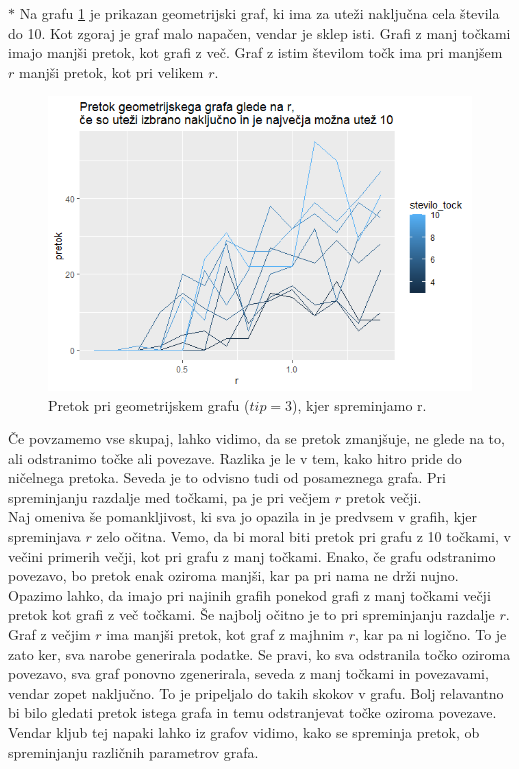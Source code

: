 \documentclass[a4paper]{article}
\begin{document}
\newpage
$\ast$  Na grafu \ref{fig16} je prikazan geometrijski graf, ki ima za uteži naključna cela števila do 10. Kot zgoraj je graf malo napačen, vendar je sklep isti. Grafi z manj točkami imajo manjši pretok, kot grafi z več. Graf z istim številom točk ima pri manjšem $r$ manjši pretok, kot pri velikem $r$. 
\begin{figure}[H]
\centerline{\includegraphics[scale=.6]{p12.PNG}}
\caption{Pretok pri geometrijskem grafu ($tip = 3$),  kjer spreminjamo r.}
\label{fig16}
\end{figure} 

Če povzamemo vse skupaj, lahko vidimo, da se pretok zmanjšuje, ne glede na to, ali odstranimo točke ali povezave. Razlika je le v tem, kako hitro pride do ničelnega pretoka. Seveda je to odvisno tudi od posameznega grafa. Pri spreminjanju razdalje med točkami, pa je pri večjem $r$ pretok večji. \\


Naj omeniva še pomankljivost, ki sva jo opazila in je predvsem v grafih, kjer spreminjava $r$ zelo očitna. Vemo, da bi moral biti pretok pri grafu z 10 točkami, v večini primerih večji, kot pri grafu z manj točkami. Enako, če grafu odstranimo povezavo, bo pretok enak oziroma manjši, kar pa pri nama ne drži nujno. Opazimo lahko, da imajo pri najinih grafih ponekod grafi z manj točkami večji pretok kot grafi z več točkami. Še najbolj očitno je to pri spreminjanju razdalje $r$. Graf z večjim $r$ ima manjši pretok, kot graf z majhnim $r$, kar pa ni logično. To je zato ker, sva narobe generirala podatke. Se pravi, ko sva odstranila točko oziroma povezavo, sva graf ponovno zgenerirala, seveda z manj točkami in povezavami, vendar zopet naključno. To je pripeljalo do takih skokov v grafu. Bolj relavantno bi bilo gledati pretok istega grafa in temu odstranjevat točke oziroma povezave. Vendar kljub tej napaki lahko iz grafov vidimo, kako se spreminja pretok, ob spreminjanju različnih parametrov grafa. 
\newpage
\end{document}
